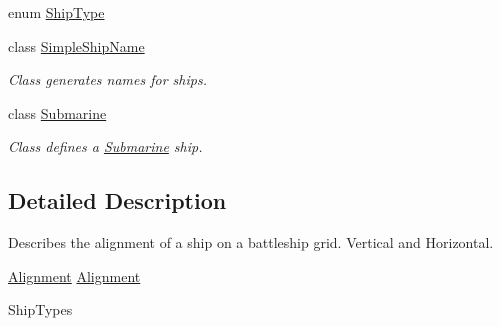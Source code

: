 \begin{DoxyCompactItemize}
enum \hyperlink{enumbattleship_1_1ships_1_1ShipType}{Ship\+Type}
\item 
class \hyperlink{classbattleship_1_1ships_1_1SimpleShipName}{Simple\+Ship\+Name}
\begin{DoxyCompactList}\small\item\em Class generates names for ships. \end{DoxyCompactList}\item 
class \hyperlink{classbattleship_1_1ships_1_1Submarine}{Submarine}
\begin{DoxyCompactList}\small\item\em Class defines a \hyperlink{classbattleship_1_1ships_1_1Submarine}{Submarine} ship. \end{DoxyCompactList}\end{DoxyCompactItemize}


\subsection{Detailed Description}
Describes the alignment of a ship on a battleship grid. Vertical and Horizontal. 

\hyperlink{enumbattleship_1_1ships_1_1Alignment}{Alignment}  \hyperlink{enumbattleship_1_1ships_1_1Alignment}{Alignment}

Ship\+Types 